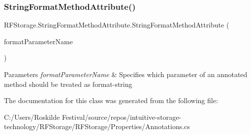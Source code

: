 \subsubsection{\texorpdfstring{StringFormatMethodAttribute()}{StringFormatMethodAttribute()}}
{\footnotesize\ttfamily R\+F\+Storage.\+String\+Format\+Method\+Attribute.\+String\+Format\+Method\+Attribute (\begin{DoxyParamCaption}\item[{\mbox{[}\+Not\+Null\mbox{]} string}]{format\+Parameter\+Name }\end{DoxyParamCaption})}


\begin{DoxyParams}{Parameters}
{\em format\+Parameter\+Name} & Specifies which parameter of an annotated method should be treated as format-\/string \\
\hline
\end{DoxyParams}


The documentation for this class was generated from the following file\+:\begin{DoxyCompactItemize}
\item 
C\+:/\+Users/\+Roskilde Festival/source/repos/intuitive-\/storage-\/technology/\+R\+F\+Storage/\+R\+F\+Storage/\+Properties/Annotations.\+cs\end{DoxyCompactItemize}
